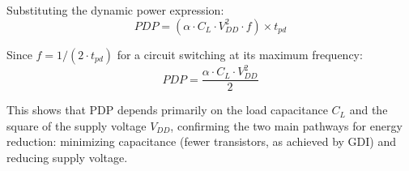 \documentclass[12pt,a4paper,oneside]{report}
\begin{document}
\noindent Substituting the dynamic power expression:
\begin{equation}
PDP = (\alpha \cdot C_L \cdot V_{DD}^2 \cdot f) \times t_{pd}
\end{equation}

\noindent Since $f = 1/(2 \cdot t_{pd})$ for a circuit switching at its maximum frequency:
\begin{equation}
PDP = \frac{\alpha \cdot C_L \cdot V_{DD}^2}{2}
\end{equation}

\noindent This shows that PDP depends primarily on the load capacitance $C_L$ and the square of the supply voltage $V_{DD}$, confirming the two main pathways for energy reduction: minimizing capacitance (fewer transistors, as achieved by GDI) and reducing supply voltage.
\end{document}
